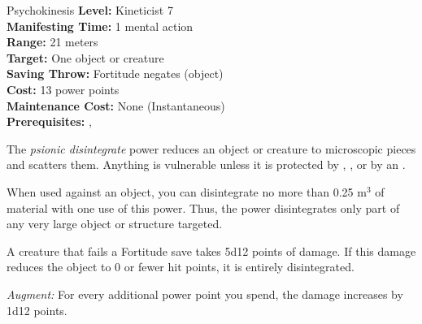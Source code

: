 {Psychokinesis}
{
	\textbf{Level:}
	Kineticist 7\\
	\textbf{Manifesting Time:}
	1 mental action\\
	\textbf{Range:}
	21 meters\\
	\textbf{Target:}
	One object or creature\\
	\textbf{Saving Throw:}
	Fortitude negates (object)\\
	\textbf{Cost:}
	13 power points\\
	\textbf{Maintenance Cost:}
	None (Instantaneous)\\
	\textbf{Prerequisites:}
	, \\
}
{
	The \emph{psionic disintegrate} power reduces an object or creature to microscopic pieces and scatters them. Anything is vulnerable unless it is protected by , , or by an .

	When used against an object, you can disintegrate no more than 0.25 m$^3$ of material with one use of this power. Thus, the power disintegrates only part of any very large object or structure targeted.

	A creature that fails a Fortitude save takes 5d12 points of damage. If this damage reduces the object to 0 or fewer hit points, it is entirely disintegrated.

	\emph{Augment:} For every additional power point you spend, the damage increases by 1d12 points.
}
